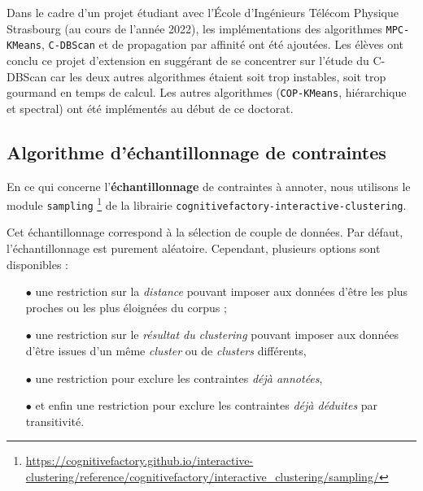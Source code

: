 	\begin{leftBarInformation}
		Dans le cadre d'un projet étudiant avec l'École d'Ingénieurs Télécom Physique Strasbourg (au cours de l'année 2022), les implémentations des algorithmes \texttt{MPC-KMeans}, \texttt{C-DBScan} et de propagation par affinité ont été ajoutées. Les élèves ont conclu ce projet d'extension en suggérant de se concentrer sur l'étude du C-DBScan car les deux autres algorithmes étaient soit trop instables, soit trop gourmand en temps de calcul.
		Les autres algorithmes (\texttt{COP-KMeans}, hiérarchique et spectral) ont été implémentés au début de ce doctorat.
	\end{leftBarInformation}
	
	
	\subsection{Algorithme d'échantillonnage de contraintes}
	\label{annex:C.1.4-DESCRIPTION-IMPLEMENTATION-INTERACTIVE-CLUSTERING-ALGORITHMES-ECHANTILLONNAGE-DE-CONTRAINTES}
	
	En ce qui concerne l'\textbf{échantillonnage} de contraintes à annoter, nous utilisons le module \texttt{sampling} \footnote{
		\url{https://cognitivefactory.github.io/interactive-clustering/reference/cognitivefactory/interactive_clustering/sampling/}
	} de la librairie \texttt{cognitivefactory-interactive-clustering}.
	
	Cet échantillonnage correspond à la sélection de couple de données.
	Par défaut, l'échantillonnage est purement aléatoire.
	Cependant, plusieurs options sont disponibles :
	
	\begin{itemize}
		\item[\(\bullet\)] une restriction sur la \textit{distance} pouvant imposer aux données d'être les plus proches ou les plus éloignées du corpus ;
		\item[\(\bullet\)] une restriction sur le \textit{résultat du clustering} pouvant imposer aux données d'être issues d'un même \textit{cluster} ou de \textit{clusters} différents,
		\item[\(\bullet\)] une restriction pour exclure les contraintes \textit{déjà annotées},
		\item[\(\bullet\)] et enfin une restriction pour exclure les contraintes \textit{déjà déduites} par transitivité.
	\end{itemize}
	
